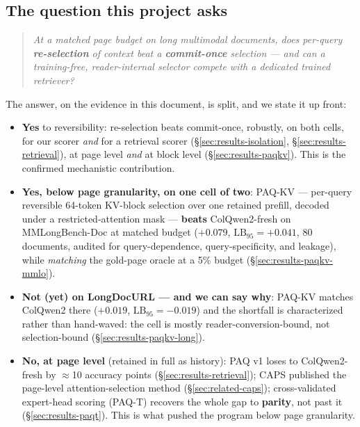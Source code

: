 \documentclass[11pt,letterpaper]{article}
\newcommand{\paq}{\textsc{PAQ}}
\newcommand{\paqt}{\textsc{PAQ-T}}
\newcommand{\paqc}{\textsc{PAQ-KV}}
\newcommand{\lb}{\mathrm{LB}_{95}}
\begin{document}
\subsection{The question this project asks}
\begin{quote}
\emph{At a matched page budget on long multimodal documents, does per-query
\textbf{re-selection} of context beat a \textbf{commit-once} selection --- and can a
training-free, reader-internal selector compete with a dedicated trained retriever?}
\end{quote}
The answer, on the evidence in this document, is split, and we state it up front:
\begin{itemize}
  \item \textbf{Yes} to reversibility: re-selection beats commit-once, robustly, on both cells,
        for our scorer \emph{and} for a retrieval scorer (\S\ref{sec:results-isolation},
        \S\ref{sec:results-retrieval}), at page level \emph{and} at block level
        (\S\ref{sec:results-paqkv}). This is the confirmed mechanistic contribution.
  \item \textbf{Yes, below page granularity, on one cell of two}: \paqc{} --- per-query
        reversible 64-token KV-block selection over one retained prefill, decoded under a
        restricted-attention mask --- \textbf{beats} ColQwen2-fresh on MMLongBench-Doc at
        matched budget ($+0.079$, $\lb=+0.041$, 80 documents, audited for query-dependence,
        query-specificity, and leakage), while \emph{matching} the gold-page oracle at a 5\%
        budget (\S\ref{sec:results-paqkv-mmlo}).
  \item \textbf{Not (yet) on LongDocURL --- and we can say why}: \paqc{} matches ColQwen2 there
        ($+0.019$, $\lb=-0.019$) and the shortfall is characterized rather than hand-waved: the
        cell is mostly reader-conversion-bound, not selection-bound
        (\S\ref{sec:results-paqkv-long}).
  \item \textbf{No, at page level} (retained in full as history): \paq{} v1 loses to
        ColQwen2-fresh \citep{faysse2025colpali} by $\approx$10 accuracy points
        (\S\ref{sec:results-retrieval}); CAPS \citep{zhu2026caps} published the page-level
        attention-selection method (\S\ref{sec:related-caps}); cross-validated expert-head
        scoring (\paqt{}) recovers the whole gap to \textbf{parity}, not past it
        (\S\ref{sec:results-paqt}). This is what pushed the program below page granularity.
\end{itemize}
\end{document}
